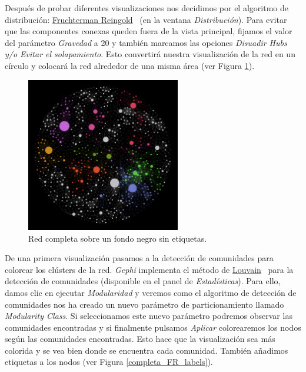 \documentclass{uimppracticas}
\begin{document}
Después de probar diferentes visualizaciones nos decidimos por el algoritmo de distribución: \href{https://github.com/gephi/gephi/wiki/Fruchterman-Reingold}{Fruchterman Reingold}~\cite{fruchterman1991graph} (en la ventana \textit{Distribución}). Para evitar que las componentes conexas queden fuera de la vista principal, fijamos el valor del parámetro \textit{Gravedad} a 20 y también marcamos las opciones \textit{Disuadir Hubs y/o Evitar el solapamiento}. Esto convertirá nuestra visualización de la red en un círculo y colocará la red alrededor de una misma área (ver Figura \ref{completa_negro_FR}). 

\begin{figure}[H]
	\centering
	\includegraphics[width=0.6\textwidth]{images/completa_negro_FR}
	\caption{Red completa sobre un fondo negro sin etiquetas.}
	\label{completa_negro_FR}
\end{figure}

De una primera visualización pasamos a la detección de comunidades para colorear los clústers de la red. \textit{Gephi} implementa el método de \href{http://perso.uclouvain.be/vincent.blondel/research/louvain.html}{Louvain}~\cite{Blondel2008} para la detección de comunidades (disponible en el panel de \textit{Estadísticas}). Para ello, damos clic en ejecutar \textit{Modularidad} y veremos como el algoritmo de detección de comunidades nos ha creado un nuevo parámetro de particionamiento llamado \textit{Modularity Class}. Si seleccionamos este nuevo parámetro podremos observar las comunidades encontradas y si finalmente pulsamos \textit{Aplicar} colorearemos los nodos según las comunidades encontradas. Esto hace que la visualización sea más colorida y se vea bien donde se encuentra cada comunidad. También añadimos etiquetas a los nodos (ver Figura \ref{completa_FR_labels}). 
\end{document}
